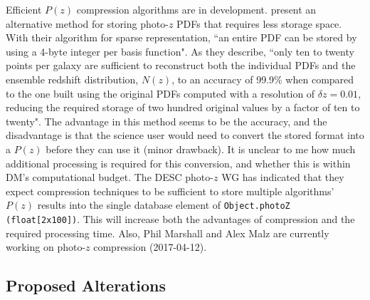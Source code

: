 \documentclass[DM,lsstdraft,toc]{lsstdoc}
\begin{document}
Efficient $P(z)$ compression algorithms are in development. \cite{2014MNRAS.441.3550C} present an alternative method for storing photo-$z$ PDFs that requires less storage space. With their algorithm for sparse representation, ``an entire PDF can be stored by using a 4-byte integer per basis function". As they describe, ``only ten to twenty points per galaxy are sufficient to reconstruct both the individual PDFs and the ensemble redshift distribution, $N(z)$, to an accuracy of 99.9\% when compared to the one built using the original PDFs computed with a resolution of $\delta z = 0.01$, reducing the required storage of two hundred original values by a factor of ten to twenty". The advantage in this method seems to be the accuracy, and the disadvantage is that the science user would need to convert the stored format into a $P(z)$ before they can use it (minor drawback). It is unclear to me how much additional processing is required for this conversion, and whether this is within DM's computational budget. The DESC photo-$z$ WG has indicated that they expect compression techniques to be sufficient to store multiple algorithms' $P(z)$ results into the single database element of {\tt Object.photoZ (float[2x100])}. This will increase both the advantages of compression and the required processing time. Also, Phil Marshall and Alex Malz are currently working on photo-$z$ compression (2017-04-12).

\subsection{Proposed Alterations}\label{ssec:format_summary}
\end{document}
